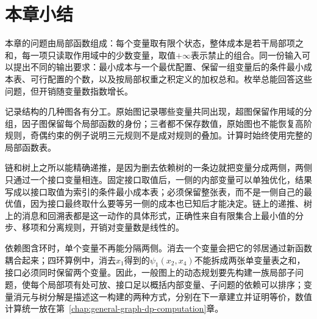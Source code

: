 \FloatBarrier
\section{本章小结}
\label{sec:tree-dp-chapter-summary}

本章的问题由局部函数组成：每个变量取有限个状态，整体成本是若干局部项之和，每一项只读取作用域中的少数变量，取值$+\infty$表示禁止的组合。同一份输入可以提出不同的输出要求：最小成本与一个最优配置、保留一组变量后的条件最小成本表、可行配置的个数，以及按局部权重之积定义的加权总和。枚举总能回答这些问题，但开销随变量数指数增长。

记录结构的几种图各有分工。原始图记录哪些变量共同出现，超图保留作用域的分组，因子图保留每个局部函数的身份；三者都不保存数值，原始图也不能恢复高阶规则，奇偶约束的例子说明三元规则不是成对规则的叠加。计算时始终使用完整的局部函数表。

链和树上之所以能精确递推，是因为删去依赖树的一条边就把变量分成两侧，两侧只通过一个接口变量相连。固定接口取值后，一侧的内部变量可以单独优化，结果写成以接口取值为索引的条件最小成本表；必须保留整张表，而不是一侧自己的最优值，因为接口最终取什么要等另一侧的成本也已知后才能决定。链上的递推、树上的消息和回溯表都是这一动作的具体形式，正确性来自有限集合上最小值的分步、移项和分离规则，开销对变量数是线性的。

依赖图含环时，单个变量不再能分隔两侧。消去一个变量会把它的邻居通过新函数耦合起来；四环算例中，消去$x_1$得到的$\psi_1(x_2,x_4)$不能拆成两张单变量表之和，接口必须同时保留两个变量。因此，一般图上的动态规划要先构建一族局部子问题，使每个局部项有处可放、接口足以概括内部变量、子问题的依赖可以排序；变量消元与树分解是描述这一构建的两种方式，分别在下一章建立并证明等价，数值计算统一放在第~\ref{chap:general-graph-dp-computation}章。
